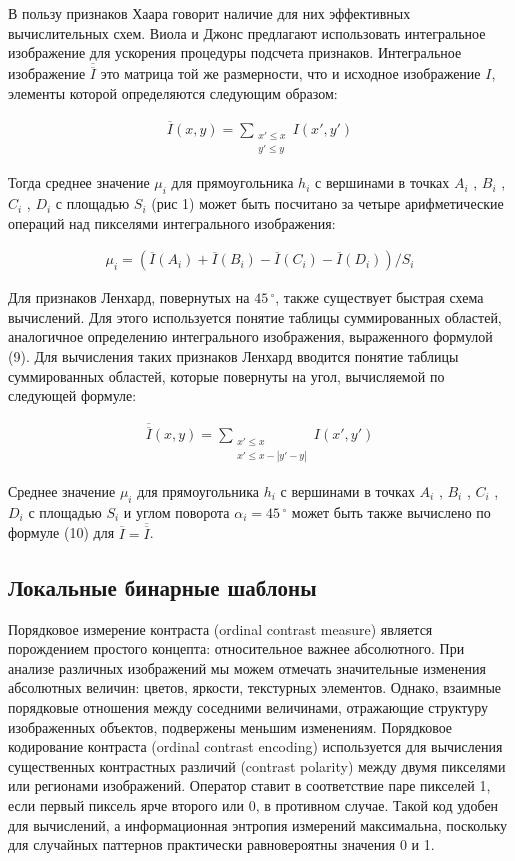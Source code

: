 \documentclass[a4paper, 14pt]{extarticle}	%
\begin{document}
В пользу признаков Хаара говорит наличие для них эффективных вычислительных схем. Виола и Джонс предлагают использовать интегральное изображение для ускорения процедуры подсчета признаков. Интегральное изображение $\overline{\overline{I}}$ это матрица той же размерности, что и исходное изображение $I$, элементы которой определяются следующим образом:

\begin{gather}
\overline{I}(x,y) = \sum\limits_{\substack{x' \le x\\y' \le y}} I(x',y')
\end{gather}

Тогда среднее значение $\mu_i$ для прямоугольника $h_i$ с вершинами в точках $A_i$ , $B_i$ , $C_i$ , $D_i$ с площадью $S_i$ (рис 1) может быть посчитано за четыре арифметические операций над пикселями интегрального изображения:

\begin{gather}
\mu_i = (\overline{I}(A_i) + \overline{I}(B_i) - \overline{I}(C_i) - \overline{I}(D_i)) / S_i
\end{gather}

Для признаков Ленхард, повернутых на $45\,^{\circ}$, также существует быстрая схема вычислений. Для этого используется понятие таблицы суммированных областей, аналогичное определению интегрального изображения, выраженного формулой (9). Для вычисления таких признаков Ленхард вводится понятие таблицы суммированных областей, которые повернуты на угол, вычисляемой по следующей формуле:

\begin{gather}
\overline{\overline{I}}(x,y) = \sum\limits_{\substack{x' \le x\\x' \le x - |y' - y|}} I(x',y')
\end{gather}

Среднее значение $\mu_i$ для прямоугольника $h_i$ с вершинами в точках $A_i$ , $B_i$ , $C_i$ , $D_i$ с площадью $S_i$ и углом поворота $\alpha_i = 45\,^{\circ}$ может быть также вычислено по формуле (10) для $\overline{I} = \overline{\overline{I}}$.

\subsection{Локальные бинарные шаблоны}

Порядковое измерение контраста (ordinal contrast measure) является порождением простого концепта: относительное важнее абсолютного. При анализе различных изображений мы можем отмечать значительные изменения абсолютных величин: цветов, яркости, текстурных элементов. Однако, взаимные порядковые отношения между соседними величинами, отражающие структуру изображенных объектов, подвержены меньшим изменениям. Порядковое кодирование контраста (ordinal contrast encoding) используется для вычисления существенных контрастных различий (contrast polarity) между двумя пикселями или регионами изображений. Оператор ставит в соответствие паре пикселей 1, если первый пиксель ярче второго или 0, в противном случае. Такой код удобен для вычислений, а информационная энтропия измерений максимальна, поскольку для случайных паттернов практически равновероятны значения 0 и 1.
\end{document}
